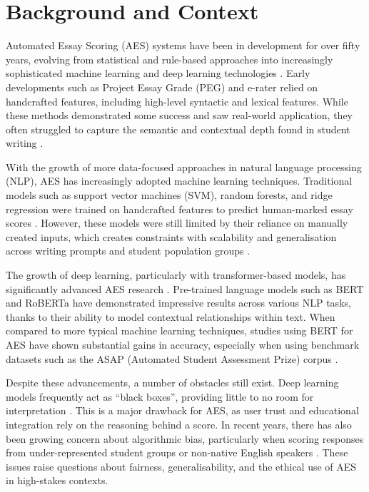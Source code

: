 \documentclass[12pt,a4paper]{report}
\begin{document}
\section{Background and Context}

Automated Essay Scoring (AES) systems have been in development for over fifty years, evolving from statistical and rule-based approaches into increasingly sophisticated machine learning and deep learning technologies \citep{zhang2020automated}. Early developments such as Project Essay Grade (PEG) \citep{page1966imminence} and e-rater \citep{e-rater2006} relied on handcrafted features, including high-level syntactic and lexical features. While these methods demonstrated some success and saw real-world application, they often struggled to capture the semantic and contextual depth found in student writing \citep{shermis2013handbook}.

With the growth of more data-focused approaches in natural language processing (NLP), AES has increasingly adopted machine learning techniques. Traditional models such as support vector machines (SVM), random forests, and ridge regression were trained on handcrafted features to predict human-marked essay scores \citep{shermis2013handbook}. However, these models were still limited by their reliance on manually created inputs, which creates constraints with scalability and generalisation across writing prompts and student population groups \citep{zhang2020automated}.

The growth of deep learning, particularly with transformer-based models, has significantly advanced AES research \citep{vaswani2017attention}. Pre-trained language models such as BERT\citep{devlin2019bert} and RoBERTa \citep{liu2019roberta} have demonstrated impressive results across various NLP tasks, thanks to their ability to model contextual relationships within text. When compared to more typical machine learning techniques, studies using BERT for AES have shown substantial gains in accuracy, especially when using benchmark datasets such as the ASAP (Automated Student Assessment Prize) corpus \citep{taghipour2016neural}.

Despite these advancements, a number of obstacles still exist. Deep learning models frequently act as ``black boxes'', providing little to no room for interpretation \citep{lundberg2017unified}. This is a major drawback for AES, as user trust and educational integration rely on the reasoning behind a score. In recent years, there has also been growing concern about algorithmic bias, particularly when scoring responses from under-represented student groups or non-native English speakers \citep{blodgett2020language}. These issues raise questions about fairness, generalisability, and the ethical use of AES in high-stakes contexts.
\end{document}
